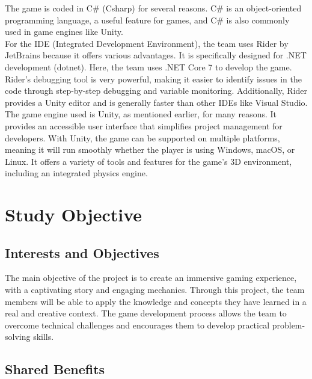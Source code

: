 \documentclass{article}
\begin{document}
The game is coded in C\# (Csharp) for several reasons. C\# is an object-oriented programming language, a useful feature for games, and C\# is also commonly used in game engines like Unity.\\

For the IDE (Integrated Development Environment), the team uses Rider by JetBrains because it offers various advantages. It is specifically designed for .NET development (dotnet). Here, the team uses .NET Core 7 to develop the game. Rider's debugging tool is very powerful, making it easier to identify issues in the code through step-by-step debugging and variable monitoring. Additionally, Rider provides a Unity editor and is generally faster than other IDEs like Visual Studio.\\

The game engine used is Unity, as mentioned earlier, for many reasons. It provides an accessible user interface that simplifies project management for developers. With Unity, the game can be supported on multiple platforms, meaning it will run smoothly whether the player is using Windows, macOS, or Linux. It offers a variety of tools and features for the game's 3D environment, including an integrated physics engine.















\newpage
\section{Study Objective}
\subsection{Interests and Objectives}\hfill

The main objective of the project is to create an immersive gaming experience, with a captivating story and engaging mechanics. Through this project, the team members will be able to apply the knowledge and concepts they have learned in a real and creative context. The game development process allows the team to overcome technical challenges and encourages them to develop practical problem-solving skills.





\subsection{Shared Benefits}\hfill
\end{document}
